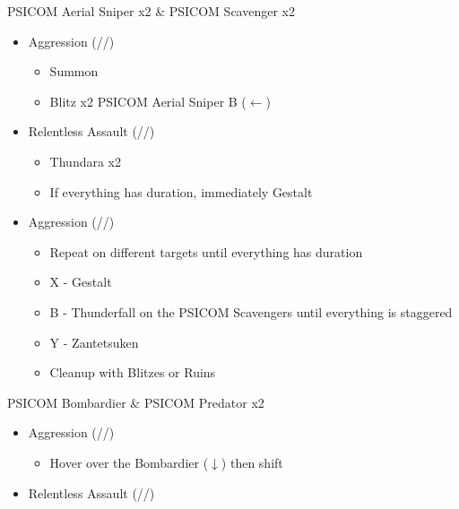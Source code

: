 \begin{multicols}{2}
  \renewcommand{\first}{[1] Aggression (\com/\com/\rav)}
  \renewcommand{\second}{[2] Relentless Assault (\rav/\com/\rav)}
  \begin{battle}{PSICOM Aerial Sniper x2 \& PSICOM Scavenger x2}
    \begin{itemize}
      \item \first
            \begin{itemize}
              \item Summon
              \item Blitz x2 PSICOM Aerial Sniper B ($\leftarrow$)
            \end{itemize}
      \item \second
            \begin{itemize}
              \item Thundara x2
              \item If everything has duration, immediately Gestalt
            \end{itemize}
      \item \first
            \begin{itemize}
              \item Repeat on different targets until everything has duration
              \item X - Gestalt
              \item B - Thunderfall on the PSICOM Scavengers until everything is staggered
              \item Y - Zantetsuken
              \item Cleanup with Blitzes or Ruins
            \end{itemize}
    \end{itemize}
     
  \end{battle}
  \begin{battle}{PSICOM Bombardier \& PSICOM Predator x2}
    \begin{itemize}
      \item \first
            \begin{itemize}
              \item Hover over the Bombardier ($\downarrow$) then shift
            \end{itemize}
      \item \second
            \begin{itemize}

\end{itemize}
\end{itemize}
\end{battle}
\end{multicols}
